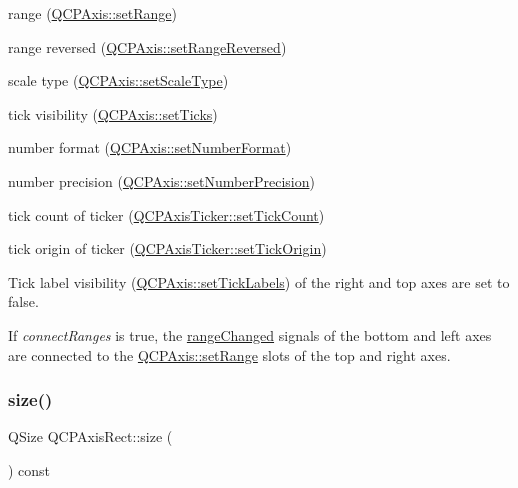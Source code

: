 \begin{DoxyItemize}
\item range (\hyperlink{class_q_c_p_axis_aebdfea5d44c3a0ad2b4700cd4d25b641}{Q\+C\+P\+Axis\+::set\+Range}) \item range reversed (\hyperlink{class_q_c_p_axis_a2172fdb196b1a0dc3f40992fcad8e9e1}{Q\+C\+P\+Axis\+::set\+Range\+Reversed}) \item scale type (\hyperlink{class_q_c_p_axis_adef29cae617af4f519f6c40d1a866ca6}{Q\+C\+P\+Axis\+::set\+Scale\+Type}) \item tick visibility (\hyperlink{class_q_c_p_axis_ac891409315bc379e3b1abdb162c1a011}{Q\+C\+P\+Axis\+::set\+Ticks}) \item number format (\hyperlink{class_q_c_p_axis_ae585a54dc2aac662e90a2ca82f002590}{Q\+C\+P\+Axis\+::set\+Number\+Format}) \item number precision (\hyperlink{class_q_c_p_axis_a21dc8023ad7500382ad9574b48137e63}{Q\+C\+P\+Axis\+::set\+Number\+Precision}) \item tick count of ticker (\hyperlink{class_q_c_p_axis_ticker_a47752abba8293e6dc18491501ae34008}{Q\+C\+P\+Axis\+Ticker\+::set\+Tick\+Count}) \item tick origin of ticker (\hyperlink{class_q_c_p_axis_ticker_ab509c7e500293bf66a8409f0d7c23943}{Q\+C\+P\+Axis\+Ticker\+::set\+Tick\+Origin})\end{DoxyItemize}
Tick label visibility (\hyperlink{class_q_c_p_axis_a04ba16e1f6f78d70f938519576ed32c8}{Q\+C\+P\+Axis\+::set\+Tick\+Labels}) of the right and top axes are set to false.

If {\itshape connect\+Ranges} is true, the \hyperlink{class_q_c_p_axis_a0894084e4c16a1736534c4095746f910}{range\+Changed} signals of the bottom and left axes are connected to the \hyperlink{class_q_c_p_axis_aebdfea5d44c3a0ad2b4700cd4d25b641}{Q\+C\+P\+Axis\+::set\+Range} slots of the top and right axes. \mbox{\label{class_q_c_p_axis_rect_a7a8289346eb612f422c704f8b75cf479}} 
\subsubsection{\texorpdfstring{size()}{size()}}
{\footnotesize\ttfamily Q\+Size Q\+C\+P\+Axis\+Rect\+::size (\begin{DoxyParamCaption}{ }\end{DoxyParamCaption}) const\hspace{0.3cm}{\ttfamily [inline]}}

